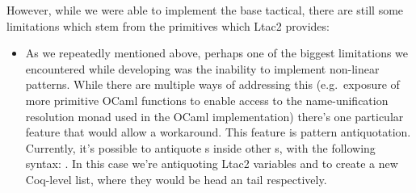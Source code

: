 However, while we were able to implement the base tactical, there are still some limitations which stem from the primitives which Ltac2 provides:
\begin{itemize}
\item
  As we repeatedly mentioned above, perhaps one of the biggest limitations we encountered while developing  was the inability to implement non-linear patterns.
While there are multiple ways of addressing this (e.g.\ exposure of more primitive
OCaml functions to enable access to the name-unification resolution monad used in the OCaml implementation) there's one particular feature that would allow a workaround.
  This feature is pattern antiquotation.
  Currently, it's possible to antiquote s inside other s, with the following syntax: .
    In this case we're antiquoting Ltac2 variables  and  to create a new Coq-level list, where they would be head an tail respectively.


\end{itemize}
